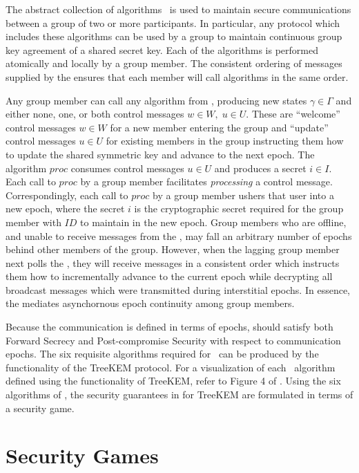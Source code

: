 The abstract collection of algorithms \CGKAdef\ is used to maintain secure communications between a group of two or more participants.
In particular, any protocol which includes these algorithms can be used by a group to maintain continuous group key agreement of a shared secret key.
Each of the algorithms is performed atomically and locally by a group member.
The consistent ordering of messages supplied by the  ensures that each member will call algorithms in the same order.

Any group member can call any algorithm from \CGKAdef, producing new states \(\gamma \in \Gamma\) and either none, one, or both control messages \(w \in W,\; u \in U\).
These are ``welcome'' control messages \(w \in W\) for a new member entering the group and ``update'' control messages \(u \in U\) for existing members in the group instructing them how to update the shared symmetric key and advance to the next epoch.
The algorithm \(proc\) consumes control messages \(u \in U\) and produces a secret \(i \in I\).
Each call to \(proc\) by a group member facilitates \emph{processing} a control message.
Correspondingly, each call to \(proc\) by a group member ushers that user into a new epoch, where the secret \(i\) is the cryptographic secret required for the group member with \(ID\) to maintain  in the new epoch.
Group members who are offline, and unable to receive messages from the , may fall an arbitrary number of epochs behind other members of the group.
However, when the lagging group member next polls the , they will receive messages in a consistent order which instructs them how to incrementally advance to the current epoch while decrypting all broadcast messages which were transmitted during interstitial epochs.
In essence, the  mediates asynchornous epoch continuity among group members.

Because the communication is defined in terms of epochs,  should satisfy both Forward Secrecy and Post-compromise Security with respect to communication epochs.
The six requisite algorithms required for \CGKAdef\ can be produced by the functionality of the TreeKEM protocol.
For a visualization of each \CGKAdef\ algorithm defined using the functionality of TreeKEM, refer to Figure 4 of \autocite{alwen2020security}.
Using the six algorithms of \CGKAdef, the security guarantees in for TreeKEM are formulated in terms of a security game.


\hypertarget{sec:security-games}{%
\section{Security Games}\label{sec:security-games}}

